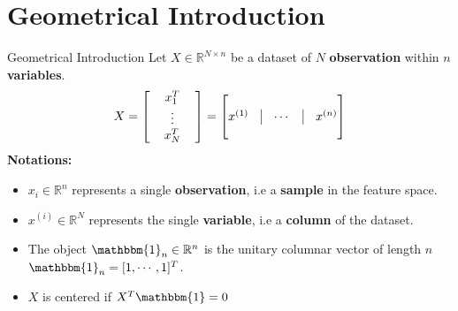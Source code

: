 \documentclass[10pt]{beamer}
\theoremstyle{definition}
\newcommand{\R}{\mathbb{R}}
\newcommand{\1}{\mathbbm{1}}
\begin{document}
\section{Geometrical Introduction}
\begin{frame}{Geometrical Introduction}
  Let $X \in \R^{N\times n}$ be a dataset of $N$
  {\bf observation} within $n$ {\bf variables}. 
  \begin{equation}
    X =
    \begin{bmatrix}
      \, & x_1 ^ T &\,\\
      \, & \vdots &\,\\
      \, & x_N ^ T &\,\\
    \end{bmatrix}
    =
    \begin{bmatrix}
      & & & \\
      x^{(1)} &\vline& \cdots& \vline& x^{(n)}\\
      & & & \\
    \end{bmatrix}
    \label{Geometrical view}
  \end{equation}
  {\bf Notations:}
  \begin{itemize}
    \item $x_i\in\R^n$ represents a single {\bf observation}, i.e a {\bf
      sample} in the feature space.
    \item $x^{(i)}\in\R^N$ represents the single {\bf variable}, i.e a {\bf
      column} of the dataset.
    \item The object $\1_n\in\R^n$ is the unitary columnar vector of length
      $n$ $\1_n=[1,\cdots,1]^T$.
    \item $X$ is centered if $X^T\1=0$
  \end{itemize}
\end{frame}
\end{document}
